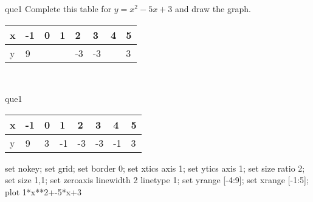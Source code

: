 \documentclass[13.5pt, varwidth=true]{beamer}
\begin{document}
\begin{frame}[shrink=19,fragile]
	\begin{beamercolorbox}[rounded=true, left, shadow=true,wd=14.8cm]{que1}
		 Complete this table for $y = x^{2} - 5x + 3$ and draw the graph. \\[0.3cm] \renewcommand{\arraystretch}{1.2}\begin{tabular}{|C|C|C|C|C|C|C|C|} \hline x & -1 & 0 & 1 & 2 & 3 & 4 & 5 \\ \hline y & 9 &  &  & -3 & -3 &  & 3\\ \hline \end{tabular}\\[0.3cm]
	\end{beamercolorbox}
\end{frame}
\begin{frame}[shrink=19,fragile]
	\begin{beamercolorbox}[rounded=true, left, shadow=true,wd=14.8cm]{que1}
		\renewcommand{\arraystretch}{1.2}\begin{tabular}{|C|C|C|C|C|C|C|C|} \hline x & -1 & 0 & 1 & 2 & 3 & 4 & 5 \\ \hline y & 9 & 3 & -1 & -3 & -3 & -1 & 3\\ \hline \end{tabular}\begin{gnuplot}[terminal=pdf] set nokey; set grid; set border 0; set xtics axis 1; set ytics axis 1; set size ratio 2; set size 1,1; set zeroaxis linewidth 2 linetype 1; set yrange [-4:9]; set xrange [-1:5]; plot 1*x**2+-5*x+3 \end{gnuplot}
	\end{beamercolorbox}
\end{frame}
\end{document}
